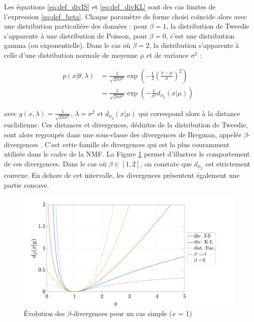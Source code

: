 Les équations \ref{eq:def_divIS} et \ref{eq:def_divKL} sont des cas limites de l'expression \ref{eq:def_beta}. Chaque paramètre de forme choisi coïncide alors avec une distribution particulière des données : pour $\beta = 1$, la distribution de Tweedie s'apparente à une distribution de Poisson, pour $\beta = 0$, c'est une distribution gamma (ou exponentielle). Dans le cas où $\beta = 2$, la distribution s'apparente à celle d'une distribution normale de moyenne $\mu$ et de variance $\sigma^2$ : 

\begin{align}
p(x \vert \theta, \lambda) & = \frac{1}{\sqrt{2 \pi \sigma^2}}\exp\left(-\frac{1}{2} \left(\frac{x-\mu}{\sigma} \right)^2 \right)\\
& = \frac{1}{\sqrt{2 \pi \sigma^2}}\exp\left(-\frac{1}{\sigma^2}  d_{\phi_{2}}(x\vert \mu) \right)
\end{align}

avec $g(x,\lambda) = \frac{1}{\sqrt{2 \pi \sigma^2}}$, $\lambda = \sigma^2$ et $d_{\phi_{2}}(x\vert \mu)$ qui correspond alors à la distance euclidienne. Ces distances et divergences, déduites de la distribution de Tweedie, sont alors regroupés dans une sous-classe des divergences de Bregman, appelée $\beta$-divergences \cite{hennequin_beta-divergence_2011}. C'est cette famille de divergences qui est la plus couramment utilisée dans le cadre de la NMF. La Figure \ref{fig:allure-divergence} permet d'illustrer le comportement de ces divergences. Dans le cas où $\beta \in \left[ 1,2 \right]$, on constate que $d_{\phi_{\beta}}$ est strictement convexe. En dehors de cet intervalle, les divergences présentent également une partie concave. \\

\begin{figure}[h]
\centering
\includegraphics[width=.7\textwidth]{./figures/NMF/betaDiv_exemple.pdf}
\caption{Évolution des $\beta$-divergences pour un cas simple ($x$ = 1)}
\label{fig:allure-divergence}
\end{figure}

